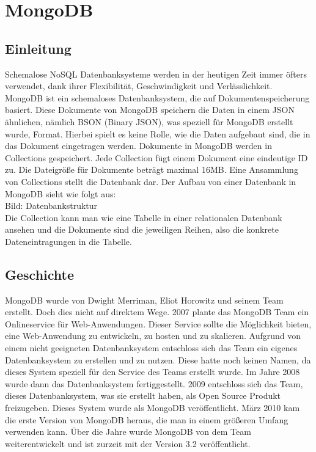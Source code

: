 \section{MongoDB}
\subsection{Einleitung}
Schemalose NoSQL Datenbanksysteme werden in der heutigen Zeit immer öfters verwendet, dank ihrer Flexibilität, Geschwindigkeit und Verlässlichkeit. MongoDB ist ein schemaloses Datenbanksystem, die auf Dokumentenspeicherung basiert. Diese Dokumente von MongoDB speichern die Daten in einem JSON ähnlichen, nämlich BSON (Binary JSON), was speziell für MongoDB erstellt wurde, Format. Hierbei spielt es keine Rolle, wie die Daten aufgebaut sind, die in das Dokument eingetragen werden. Dokumente in MongoDB werden in Collections gespeichert. Jede Collection fügt einem Dokument eine eindeutige ID zu.  Die Dateigröße für Dokumente beträgt maximal 16MB. Eine Ansammlung von Collections stellt die Datenbank dar.
Der Aufbau von einer Datenbank in MongoDB sieht wie folgt aus:
\\
Bild: Datenbankstruktur
\\
Die Collection kann man wie eine Tabelle in einer relationalen Datenbank ansehen und die Dokumente sind die jeweiligen Reihen, also die konkrete Dateneintragungen in die Tabelle.
\subsection{Geschichte}
MongoDB wurde von Dwight Merriman, Eliot Horowitz und seinem Team erstellt. Doch dies nicht auf direktem Wege. 2007 plante das MongoDB Team ein Onlineservice für Web-Anwendungen. Dieser Service sollte die Möglichkeit bieten, eine Web-Anwendung zu entwickeln, zu hosten und zu skalieren. Aufgrund von einem nicht geeigneten Datenbanksystem entschloss sich das Team ein eigenes Datenbanksystem zu erstellen und zu nutzen. Diese hatte noch keinen Namen, da dieses System speziell für den Service des Teams erstellt wurde. Im Jahre 2008 wurde dann das Datenbanksystem fertiggestellt. 2009 entschloss sich das Team, dieses Datenbanksystem, was sie erstellt haben, als Open Source Produkt freizugeben. Dieses System wurde als MongoDB veröffentlicht. März 2010 kam die erste Version von MongoDB heraus, die man in einem größeren Umfang verwenden kann. Über die Jahre wurde MongoDB von dem Team weiterentwickelt und ist zurzeit mit der Version 3.2 veröffentlicht. 
